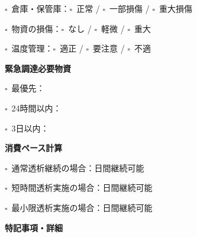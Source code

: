 \documentclass[a4paper,12pt]{jarticle}
\newcommand{\checkbox}{$\square$\ }
\newcommand{\underlinespace}[1]{\underline{\hspace{#1}}}
\begin{document}
\noindent
\checkbox 倉庫・保管庫：\quad \checkbox 正常 \quad / \quad \checkbox 一部損傷 \quad / \quad \checkbox 重大損傷

\vspace{2mm}

\noindent
\checkbox 物資の損傷：\quad \checkbox なし \quad / \quad \checkbox 軽微 \quad / \quad \checkbox 重大

\vspace{2mm}

\noindent
\checkbox 温度管理：\quad \checkbox 適正 \quad / \quad \checkbox 要注意 \quad / \quad \checkbox 不適

\vspace{8mm}

\begin{center}
\textbf{\large 緊急調達必要物資}
\end{center}

\vspace{3mm}

\noindent
\checkbox 最優先：\underlinespace{10cm}

\vspace{2mm}

\noindent
\checkbox 24時間以内：\underlinespace{10cm}

\vspace{2mm}

\noindent
\checkbox 3日以内：\underlinespace{10cm}

\vspace{8mm}

\begin{center}
\textbf{\large 消費ペース計算}
\end{center}

\vspace{3mm}

\noindent
\checkbox 通常透析継続の場合：\underlinespace{2cm}日間継続可能

\vspace{2mm}

\noindent
\checkbox 短時間透析実施の場合：\underlinespace{2cm}日間継続可能

\vspace{2mm}

\noindent
\checkbox 最小限透析実施の場合：\underlinespace{2cm}日間継続可能

\vspace{8mm}

\begin{center}
\textbf{\large 特記事項・詳細}
\end{center}

\vspace{3mm}

\noindent
\underlinespace{13cm}

\vspace{3mm}

\noindent
\underlinespace{13cm}

\vspace{3mm}

\noindent
\underlinespace{13cm}

\vspace{3mm}

\noindent
\underlinespace{13cm}

\vspace{3mm}

\noindent
\underlinespace{13cm}
\end{document}

